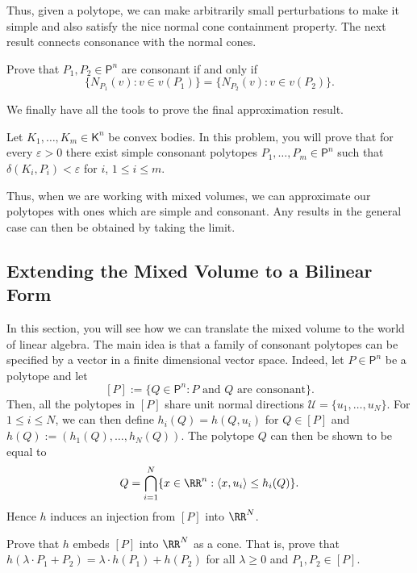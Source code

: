 \documentclass[11pt]{article}
\begin{document}
Thus, given a polytope, we can make arbitrarily small perturbations to make it simple and also satisfy the nice normal cone containment property. The next result connects consonance with the normal cones. 

\begin{prob} [40 points]
    Prove that $P_1, P_2 \in \mathsf{P}^n$ are consonant if and only if 
    \[
        \{N_{P_1}(v) : v \in v(P_1) \} = \{N_{P_2}(v) : v \in v(P_2) \}.   
    \]
\end{prob}

We finally have all the tools to prove the final approximation result. 

\begin{prob} [40 points]
    Let $K_1, \ldots, K_m \in \mathsf{K}^n$ be convex bodies. In this problem, you will prove that for every $\varepsilon > 0$ there exist simple consonant polytopes $P_1, \ldots, P_m \in \mathsf{P}^n$ such that $\delta(K_i, P_i) < \varepsilon$ for $i$, $1 \leq i \leq m$.
\end{prob}

Thus, when we are working with mixed volumes, we can approximate our polytopes with ones which are simple and consonant. Any results in the general case can then be obtained by taking the limit.

\subsection{Extending the Mixed Volume to a Bilinear Form}
In this section, you will see how we can translate the mixed volume to the world of linear algebra. The main idea is that a family of consonant polytopes can be specified by a vector in a finite dimensional vector space. Indeed, let $P \in \mathsf{P}^n$ be a polytope and let 
\[
    [P] := \{Q \in \mathsf{P}^n : \text{$P$ and $Q$ are consonant} \}.
\]
Then, all the polytopes in $[P]$ share unit normal directions $\mathcal{U} = \{u_1, \ldots, u_N\}$. For $1 \leq i \leq N$, we can then define $h_i(Q) = h(Q, u_i)$ for $Q \in [P]$ and $h(Q) := (h_1(Q), \ldots, h_N(Q))$. The polytope $Q$ can then be shown to be equal to 
\[
    Q = \bigcap_{i = 1}^N \{ x \in \RR^n : \langle x, u_i \rangle \leq h_i(Q)\}.    
\]
Hence $h$ induces an injection from $[P]$ into $\RR^N$. 

\begin{prob} [5 points]
    Prove that $h$ embeds $[P]$ into $\RR^N$ as a cone. That is, prove that $h(\lambda \cdot P_1 + P_2) = \lambda \cdot h(P_1) + h(P_2)$ for all $\lambda \geq 0$ and $P_1, P_2 \in [P]$. 
\end{prob}
\end{document}
